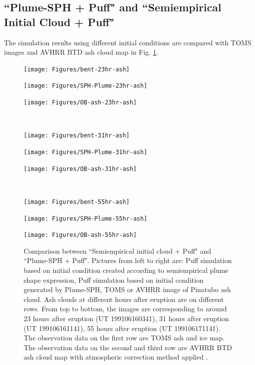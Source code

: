 \documentclass[draft,linenumbers]{agujournal2019}
\begin{document}
\subsection{``Plume-SPH + Puff" and ``Semiempirical Initial Cloud + Puff"}

The simulation results using different initial conditions are compared with TOMS images and AVHRR BTD ash cloud map in Fig. \ref{fig:Plume-SPH-Puff-ash-cloud}.

\begin{figure}[!htb]
\centering
\begin{minipage}{.325\textwidth}
\centering
\texttt{[image: Figures/bent-23hr-ash]}
\end{minipage}%
\begin{minipage}{.325 \textwidth}
\centering
\texttt{[image: Figures/SPH-Plume-23hr-ash]}
\end{minipage}%
\begin{minipage}{.325 \textwidth}
\centering
\texttt{[image: Figures/OB-ash-23hr-ash]}
\end{minipage}%
\\
\begin{minipage}{.325\textwidth}
\centering
\texttt{[image: Figures/bent-31hr-ash]}
\end{minipage}%
\begin{minipage}{.325 \textwidth}
\centering
\texttt{[image: Figures/SPH-Plume-31hr-ash]}
\end{minipage}%
\begin{minipage}{.325 \textwidth}
\centering
\texttt{[image: Figures/OB-ash-31hr-ash]}
\end{minipage}%
\\
\begin{minipage}{.325\textwidth}
\centering
\texttt{[image: Figures/bent-55hr-ash]}
\end{minipage}%
\begin{minipage}{.325 \textwidth}
\centering
\texttt{[image: Figures/SPH-Plume-55hr-ash]}
\end{minipage}%
\begin{minipage}{.325 \textwidth}
\centering
\texttt{[image: Figures/OB-ash-55hr-ash]}
\end{minipage}%
\caption{Comparison between ``Semiempirical initial cloud + Puff" and ``Plume-SPH + Puff". Pictures from left to right are: Puff simulation based on initial condition created according to semiempirical plume shape expression, Puff simulation based on initial condition generated by Plume-SPH, TOMS or AVHRR image of Pinatubo ash cloud. Ash clouds at different hours after eruption are on different rows. From top to bottom, the images are corresponding to around 23 hours after eruption (UT 199106160341), 31 hours after eruption (UT 199106161141), 55 hours after eruption (UT 199106171141). The observation data on the first row are TOMS ash and ice map. The observation data on the second and third row are AVHRR BTD ash cloud map with atmospheric correction method applied \citep{guo2004particles}.}
\label{fig:Plume-SPH-Puff-ash-cloud}
\end{figure}
\end{document}

